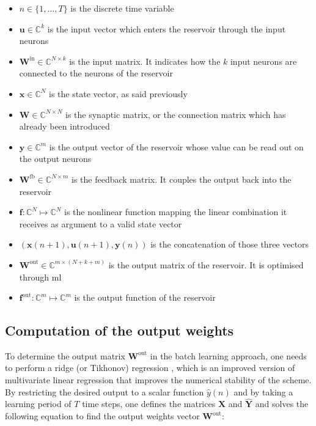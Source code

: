 \begin{itemize}
	\item $n \in \{1, \dots, T\}$ is the discrete time variable
	\item $\mathbf{u} \in \mathbb{C}^k$ is the input vector which enters the reservoir through the input neurons
	\item $\mathbf{W}^{\text{in}} \in \mathbb{C}^{N \times k}$ is the input matrix. It indicates how the $k$ input neurons are connected to the neurons of the reservoir
	\item $\mathbf{x} \in \mathbb{C}^{N}$ is the state vector, as said previously
	\item $\mathbf{W} \in \mathbb{C}^{N \times N}$ is the synaptic matrix, or the connection matrix which has already been introduced
	\item $\mathbf{y} \in \mathbb{C}^{m}$ is the output vector of the reservoir whose value can be read out on the output neurons
	\item $\mathbf{W}^{\text{fb}} \in \mathbb{C}^{N \times m}$ is the feedback matrix. It couples the output back into the reservoir
	\item $\mathbf{f}: \mathbb{C}^N \mapsto \mathbb{C}^N$ is the nonlinear function mapping the linear combination it receives as argument to a valid state vector
	\item $\left(\mathbf{x}(n+1), \mathbf{u}(n+1), \mathbf{y}(n)\right)$ is the concatenation of those three vectors
	\item $\mathbf{W}^{\text{out}} \in \mathbb{C}^{m \times (N+k+m)}$ is the output matrix of the reservoir. It is optimised through \gls{ml}
	\item $\mathbf{f}^{\text{out}} : \mathbb{C}^{m} \mapsto \mathbb{C}^{m}$ is the output function of the reservoir
\end{itemize}


\subsection{Computation of the output weights}

To determine the output matrix $\mathbf{W}^{\text{out}}$ in the batch learning approach, one needs to perform a ridge (or Tikhonov) regression \cite{NIPS2010_4056}, which is an improved version of multivariate linear regression that improves the numerical stability of the scheme. By restricting the desired output to a scalar function $\hat{y}(n)$ and by taking a learning period of $T$ time steps, one defines the matrices $\mathbf{X}$ and $\hat{\mathbf{Y}}$ and solves the following equation to find the output weights vector $\mathbf{W}^{\text{out}}$:

